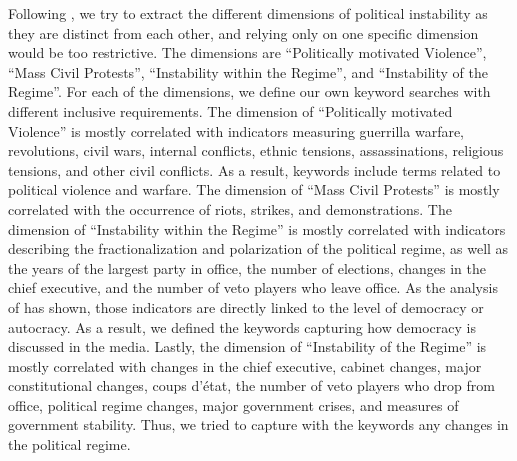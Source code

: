 \documentclass[12pt,a4paper,fleqn]{article}
\begin{document}
Following \cite{JONGAPIN2009}, we try to extract the different dimensions of political instability as they are distinct from each other, and relying only on one specific dimension would be too restrictive. The dimensions are ``Politically motivated Violence'', ``Mass Civil Protests'', ``Instability within the Regime'', and ``Instability of the Regime''. For each of the dimensions, we define our own keyword searches with different inclusive requirements. The dimension of ``Politically motivated Violence'' is mostly correlated with indicators measuring guerrilla warfare, revolutions, civil wars, internal conflicts, ethnic tensions, assassinations, religious tensions, and other civil conflicts. As a result, keywords include terms related to political violence and warfare. The dimension of ``Mass Civil Protests'' is mostly correlated with the occurrence of riots, strikes, and demonstrations. The dimension of ``Instability within the Regime'' is mostly correlated with indicators describing the fractionalization and polarization of the political regime, as well as the years of the largest party in office, the number of elections, changes in the chief executive, and the number of veto players who leave office. As the analysis of \cite{JONGAPIN2009} has shown, those indicators are directly linked to the level of democracy or autocracy. As a result, we defined the keywords capturing how democracy is discussed in the media. Lastly, the dimension of ``Instability of the Regime'' is mostly correlated with changes in the chief executive, cabinet changes, major constitutional changes, coups d'état, the number of veto players who drop from office, political regime changes, major government crises, and measures of government stability. Thus, we tried to capture with the keywords any changes in the political regime.
\end{document}
